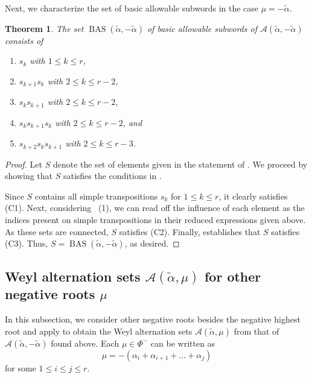 \documentclass{amsart}
\newtheorem{theorem}{Theorem}[section]
\theoremstyle{definition}
\DeclareMathOperator{\BAS}{BAS}
\newcommand{\hroot}{\tilde{\alpha}}
\newcommand{\calA}{\mathcal{A}}
\begin{document}
\smallskip

Next, we characterize the set of basic allowable subwords in the case $\mu=-\hroot$.

\begin{theorem} \label{thm:BAS_for_negAlpha}
    The set $\BAS(\tilde\alpha,-\tilde\alpha)$ of basic allowable subwords of $\calA(\tilde\alpha,-\tilde\alpha)$ consists of \begin{enumerate}
        \item[(a)] $s_k$ with $1 \le k \le r$,
\item[(b)] $s_{k+1}s_{k}$ with $2 \le k \le r-2$,
\item[(c)] $s_{k}s_{k+1}$ with $2 \le k \le r-2$, 
\item[(d)] $s_{k}s_{k+1}s_{k}$ with $2 \le k \le r-2$, and
\item[(e)] $s_{k+2}s_{k}s_{k+1}$ with $2 \le k \le r-3$.
\end{enumerate}
\end{theorem}

\begin{proof}
    Let $S$ denote the set of elements given in the statement of . We proceed by showing that $S$ satisfies the conditions in . 

    Since $S$ contains all simple transpositions $s_k$ for $1\leq k\leq r$, it clearly satisfies (C1). Next, considering ~(1), we can read off the influence of each element as the indices present on simple transpositions in their reduced expressions given above. As these sets are connected, $S$ satisfies (C2). Finally,  establishes that $S$ satisfies (C3). Thus, $S=\BAS(\tilde\alpha,-\tilde\alpha)$, as desired.
\end{proof}


\subsection{Weyl alternation sets \texorpdfstring{$\calA(\hroot,\mu)$}{A(alpha tilde, mu)} for other negative roots \texorpdfstring{$\mu$}{mu}}\label{sec:OtherMu}


In this subsection, we consider other negative roots besides the negative highest root and apply  to obtain the Weyl alternation sets $\calA(\hroot,\mu)$ from that of $\calA(\hroot,-\tilde{\alpha})$ found above. Each $\mu\in\Phi^-$ can be written as \[\mu=-(\alpha_i+\alpha_{i+1}+\dots+\alpha_j)\] for some $1\leq i\leq j\leq r$.
\end{document}
